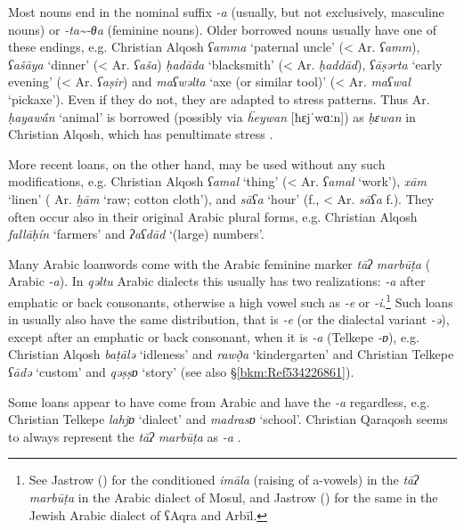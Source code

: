 \documentclass[output=paper]{langsci/langscibook}
\begin{document}
Most  nouns end in the nominal suffix \textit{{}-a} (usually, but not exclusively, masculine nouns) or \textit{{}-ta{\textasciitilde}-θa} (feminine nouns). Older borrowed nouns usually have one of these endings, e.g. Christian Alqosh \textit{ʕamma} ‘paternal uncle’ (< Ar. \textit{ʕamm}), \textit{ʕašāya} ‘dinner’ (<  Ar. \textit{ʕaša}) \textit{ḥadāda} ‘blacksmith’ (< Ar. \textit{ḥaddād}), \textit{ʕāṣərta} ‘early evening’ (<  Ar. \textit{ʕaṣir}) and \textit{maʕwəlta} ‘axe (or similar tool)’ (<  Ar. \textit{maʕwal} ‘pickaxe’). Even if they do not, they are adapted to  {stress} patterns. Thus Ar. \textit{ḥayaw\'{ā}n} ‘animal’ is borrowed (possibly via  \textit{ḧeywan} [ħɛjˈwɑːn]) as \textit{ḥɛwan} in Christian Alqosh, which has penultimate {stress} \citep[81]{Coghill2004}.

More recent loans, on the other hand, may be used without any such modifications, e.g. Christian Alqosh \textit{ʕamal} ‘thing’ (< Ar. \textit{ʕamal} ‘work’), \textit{xām} ‘linen’ ( Ar. \textit{ḫām} ‘raw; cotton cloth’), and \textit{sāʕa} ‘hour’ (f., < Ar. \textit{sāʕa} f.). They often occur also in their original Arabic plural forms, e.g. Christian Alqosh \textit{fallāḥín} ‘farmers’ and \textit{ʔaʕdād} ‘(large) numbers’. 

Many Arabic {loanwords} come with the Arabic feminine marker \textit{tāʔ} \textit{marbūṭa} ( Arabic \textit{\nobreakdash-a}). In \textit{qəltu} Arabic dialects this usually has two realizations: \textit{\nobreakdash-a} after {emphatic} or back consonants, otherwise a high vowel such as \textit{\nobreakdash-e} or \textit{\nobreakdash-i}.\footnote{See Jastrow (\citeyear[40]{Jastrow1979}) for the conditioned \textit{imāla} (raising of a-vowels) in the \textit{tāʔ} \textit{marbūṭa} in the Arabic dialect of Mosul, and Jastrow (\citeyear[70]{Jastrow1990book}) for the same in the Jewish Arabic dialect of ʕAqra and Arbīl.} Such loans in  usually also have the same distribution, that is \textit{{}-e} (or the dialectal variant \textit{-ə}), except after an {emphatic} or back consonant, when it is \textit{\nobreakdash-a} (Telkepe \textit{\nobreakdash-ɒ}), e.g. Christian Alqosh \textit{baṭālə} ‘idleness’ and \textit{rawð̣a} ‘kindergarten’ and Christian Telkepe \textit{ʕādə} ‘custom’ and \textit{qəṣṣɒ} ‘story’ (see also §\ref{bkm:Ref534226861}).

Some loans appear to have come from  Arabic and have the \textit{\nobreakdash-a} regardless, e.g. Christian Telkepe \textit{lahjɒ} ‘dialect’ and \textit{madrasɒ} ‘school’. Christian Qaraqosh seems to always represent the \textit{tāʔ} \textit{marbūṭa} as \textit{{}-a} \citep[204]{Khan2002}.
\end{document}
